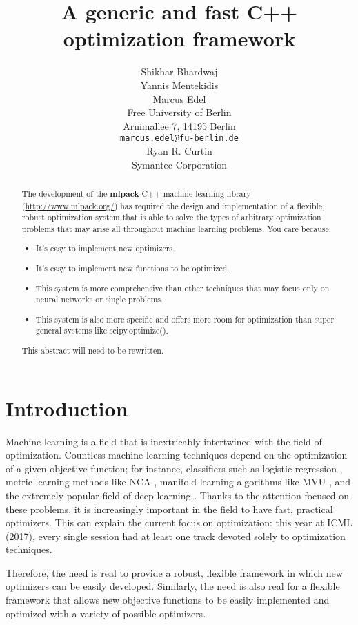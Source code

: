 \documentclass{article}
\title{A generic and fast C++ optimization framework}
\author{
  Shikhar Bhardwaj \\
  \AND
  Yannis Mentekidis \\
  \AND
  Marcus Edel \\
  Free University of Berlin \\
  Arnimallee 7, 14195 Berlin \\
  \texttt{marcus.edel@fu-berlin.de} \\
  \AND
  Ryan R. Curtin \\
  Symantec Corporation \\
}
\begin{document}

\maketitle

\begin{abstract}
The development of the {\bf mlpack} C++ machine learning library
(\url{http://www.mlpack.org/}) has required the design and implementation of a
flexible, robust optimization system that is able to solve the types of
arbitrary optimization problems that may arise all throughout machine learning
problems.  You care because:

\begin{itemize}
  \item It's easy to implement new optimizers.
  \item It's easy to implement new functions to be optimized.
  \item This system is more comprehensive than other techniques that may focus
only on neural networks or single problems.
  \item This system is also more specific and offers more room for optimization
than super general systems like scipy.optimize().
\end{itemize}

This abstract will need to be rewritten.
\end{abstract}

\section{Introduction}

Machine learning is a field that is inextricably intertwined with the field of
optimization.  Countless machine learning techniques depend on the optimization
of a given objective function; for instance, classifiers such as logistic
regression \cite{cox1958regression}, metric learning methods like NCA
\cite{goldberger2005neighbourhood}, manifold learning algorithms like MVU
\cite{weinberger2006introduction}, and the extremely popular field of deep
learning \cite{schmidhuber2015deep}.  Thanks to the attention focused on these
problems, it is increasingly important in the field to have fast, practical
optimizers.  This can explain the current focus on optimization: this year at
ICML (2017), every single session had at least one track devoted solely to
optimization techniques.

Therefore, the need is real to provide a robust, flexible framework in which
new optimizers can be easily developed.  Similarly, the need is also real for a
flexible framework that allows new objective functions to be easily implemented
and optimized with a variety of possible optimizers.
\end{document}
